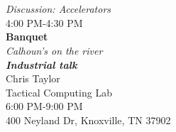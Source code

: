 \begin{calendar}{\textwidth}
{~ \\\vspace{0.1cm}  \\\daysep
\textit{Discussion: Accelerators}  \\\vspace{0.1cm}4:00 PM-4:30 PM \\\daysep
\textbf{Banquet} \\
\textit{Calhoun's on the river}\\\vspace{0.1cm} \textbf{\textit{Industrial talk}} \\ Chris Taylor \\Tactical Computing Lab \\\vspace{0.1cm}  6:00 PM-9:00 PM \\ 400 Neyland Dr, Knoxville, TN 37902\\\daysep
}




\end{calendar}
